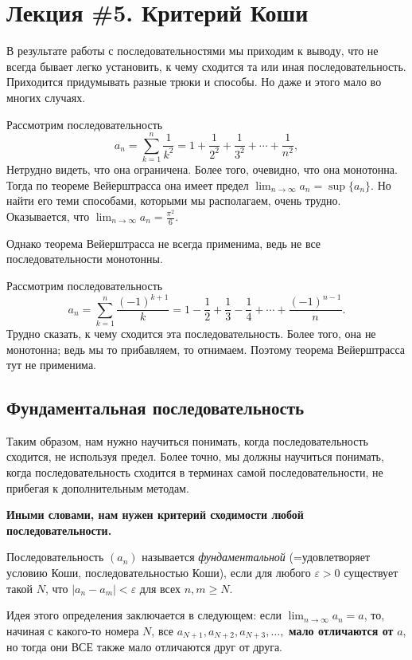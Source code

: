 \section{Лекция \#5. Критерий Коши}

В результате работы с последовательностями мы приходим к выводу, что не всегда бывает легко установить, к чему сходится та или иная последовательность. Приходится придумывать разные трюки и способы. Но даже и этого мало во многих случаях.

\begin{example}
    Рассмотрим последовательность
    \[
    a_n = \sum_{k=1}^n \frac{1}{k^2} = 1 + \frac{1}{2^2} + \frac{1}{3^2} + \cdots + \frac{1}{n^2},
    \]
    Нетрудно видеть, что она ограничена. Более того, очевидно, что она монотонна. Тогда по теореме Вейерштрасса она имеет предел $\lim_{n \to \infty}a_n = \sup\{a_n\}$. Но найти его теми способами, которыми мы располагаем, очень трудно. Оказывается, что $\lim_{n \to \infty}a_n = \frac{\pi^2}{6}.$
\end{example}

Однако теорема Вейерштрасса не всегда применима, ведь не все последовательности монотонны.

\begin{example}
    Рассмотрим последовательность
    \[
    a_n = \sum_{k=1}^n \frac{(-1)^{k+1}}{k} = 1 -\frac{1}{2} + \frac{1}{3} - \frac{1}{4} + \cdots + \frac{(-1)^{n-1}}{n}.
    \]
    Трудно сказать, к чему сходится эта последовательность. Более того, она не монотонна; ведь мы то прибавляем, то отнимаем. Поэтому теорема Вейерштрасса тут не применима.
\end{example}

\subsection{Фундаментальная последовательность}

Таким образом, нам нужно научиться понимать, когда последовательность сходится, не используя предел. Более точно, мы должны научиться понимать, когда последовательность сходится в терминах самой последовательности, не прибегая к дополнительным методам.

\textbf{Иными словами, нам нужен критерий сходимости любой последовательности.}

\begin{definition}\label{foundamental_sequence}
    Последовательность $(a_n)$ называется \textit{фундаментальной} (=удовлетворяет условию Коши, последовательностью Коши), если для любого $\varepsilon >0$ существует такой $N$, что $|a_n -a_m| < \varepsilon$ для всех $n,m \ge N$.
\end{definition}
\begin{comments}
    Идея этого определения заключается в следующем: если $\lim_{n\to \infty}a_n =a$, то, начиная с какого-то номера $N$, все $a_{N+1}, a_{N+2}, a_{N+3}, \ldots,$ \textbf{мало отличаются от} $a$, но тогда они ВСЕ также мало отличаются друг от друга.
\end{comments}


